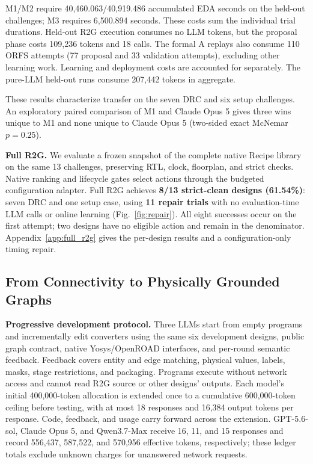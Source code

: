 M1/M2 require 40,460.063/40,919.486 accumulated EDA seconds on the held-out challenges; M3 requires 6,500.894 seconds. These costs sum the individual trial durations. Held-out R2G execution consumes no LLM tokens, but the proposal phase costs 109,236 tokens and 18 calls. The formal A replays also consume 110 ORFS attempts (77 proposal and 33 validation attempts), excluding other learning work. Learning and deployment costs are accounted for separately. The pure-LLM held-out runs consume 207,442 tokens in aggregate.



These results characterize transfer on the seven DRC and six setup challenges. An exploratory paired comparison of M1 and Claude Opus 5 gives three wins unique to M1 and none unique to Claude Opus 5 (two-sided exact McNemar $p=0.25$).

\textbf{Full R2G.} We evaluate a frozen snapshot of the complete native Recipe library on the same 13 challenges, preserving RTL, clock, floorplan, and strict checks. Native ranking and lifecycle gates select actions through the budgeted configuration adapter. Full R2G achieves \textbf{8/13 strict-clean designs (61.54\%)}: seven DRC and one setup case, using \textbf{11 repair trials} with no evaluation-time LLM calls or online learning (Fig.~\ref{fig:repair}). All eight successes occur on the first attempt; two designs have no eligible action and remain in the denominator. Appendix~\ref{app:full_r2g} gives the per-design results and a configuration-only timing repair.

\subsection{From Connectivity to Physically Grounded Graphs}
\label{sec:e4}
\textbf{Progressive development protocol.} Three LLMs start from empty programs and incrementally edit converters using the same six development designs, public graph contract, native Yosys/OpenROAD interfaces, and per-round semantic feedback. Feedback covers entity and edge matching, physical values, labels, masks, stage restrictions, and packaging. Programs execute without network access and cannot read R2G source or other designs' outputs. Each model's initial 400,000-token allocation is extended once to a cumulative 600,000-token ceiling before testing, with at most 18 responses and 16,384 output tokens per response. Code, feedback, and usage carry forward across the extension. GPT-5.6-sol, Claude Opus 5, and Qwen3.7-Max receive 16, 11, and 15 responses and record 556,437, 587,522, and 570,956 effective tokens, respectively; these ledger totals exclude unknown charges for unanswered network requests.

